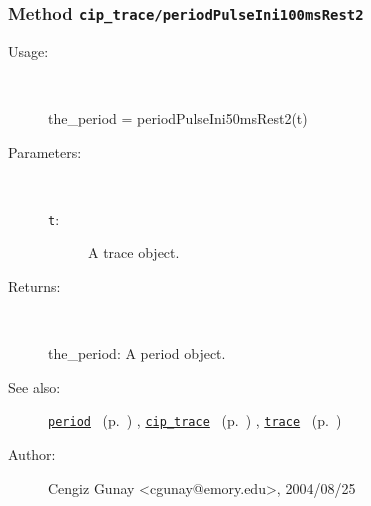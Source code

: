 \subsubsection[Method \texttt{periodPulseIni100msRest2}]{Method \texttt{cip\_trace/periodPulseIni100msRest2}}%
%
\label{ref_cip_trace__periodPulseIni100msRest2}%
\hypertarget{ref_cip_trace__periodPulseIni100msRest2}{}%
\begin{description}
%
\item[Usage:]~%
\begin{lyxcode}%
the\_period = periodPulseIni50msRest2(t)
%
\end{lyxcode}%
%
%
\item[Parameters:]~
\begin{description}%
\item[\texttt{t}:]
 A trace object.
\end{description}%
%
\item[Returns:
]~

	the\_period: A period object.
%
%
\item[See also:]%
\hyperlink{ref_period}{\texttt{period}}%
\ (p.~\pageref{ref_period})%
%
, \hyperlink{ref_cip_trace}{\texttt{cip\_trace}}%
\ (p.~\pageref{ref_cip_trace})%
%
, \hyperlink{ref_trace}{\texttt{trace}}%
\ (p.~\pageref{ref_trace})%
%
%
\item[Author:]%
Cengiz Gunay <cgunay@emory.edu>, 2004/08/25
%
\end{description}
\methodline%
